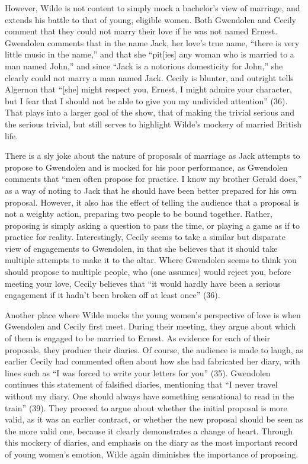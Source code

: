 \documentclass[12pt]{article}[titlepage]
\newcommand{\say}[1]{``#1''}
\newcommand{\1}{\={a}}
\newcommand{\2}{\={e}}
\newcommand{\3}{\={\i}}
\newcommand{\4}{\=o}
\newcommand{\5}{\=u}
\newcommand{\6}{\={A}}
\renewcommand{\,}{\textsuperscript{,}}
\begin{document}
However, Wilde is not content to simply mock a bachelor's view of marriage, and extends his battle to that of young, eligible women.
Both Gwendolen and Cecily comment that they could not marry their love if he was not named Ernest.
Gwendolen comments that in the name Jack, her love's true name, \say{there is very little music in the name,} and that she \say{pit[ies] any woman who is married to a man named John,} and since \say{Jack is a notorious domesticity for John,} she clearly could not marry a man named Jack.
Cecily is blunter, and outright tells Algernon that \say{[she] might respect you, Ernest, I might admire your character, but I fear that I should not be able to give you my undivided attention} (36).
That plays into a larger goal of the show, that of making the trivial serious and the serious trivial, but still serves to highlight Wilde's mockery of married British life.

There is a sly joke about the nature of proposals of marriage as Jack attempts to propose to Gwendolen and is mocked for his poor performance, as Gwendolen comments that \say{men often propose for practice. I know my brother Gerald does,} as a way of noting to Jack that he should have been better prepared for his own proposal.
However, it also has the effect of telling the audience that a proposal is not a weighty action, preparing two people to be bound together.
Rather, proposing is simply asking a question to pass the time, or playing a game as if to practice for reality.
Interestingly, Cecily seems to take a similar but disparate view of engagements to Gwendolen, in that she believes that it should take multiple attempts to make it to the altar.
Where Gwendolen seems to think you should propose to multiple people, who (one assumes) would reject you, before meeting your love, Cecily believes that \say{it would hardly have been a serious engagement if it hadn't been broken off at least once} (36).

Another place where Wilde mocks the young women's perspective of love is when Gwendolen and Cecily first meet.
During their meeting, they argue about which of them is engaged to be married to Ernest.
As evidence for each of their proposals, they produce their diaries.
Of course, the audience is made to laugh, as earlier Cecily had commented often about how she had fabricated her diary, with lines such as \say{I was forced to write your letters for you} (35).
Gwendolen continues this statement of falsified diaries, mentioning that \say{I never travel without my diary. One should always have something sensational to read in the train} (39).
They proceed to argue about whether the initial proposal is more valid, as it was an earlier contract, or whether the new proposal should be seen as the more valid one, because it clearly demonstrates a change of heart.
Through this mockery of diaries, and emphasis on the diary as the most important record of young women's emotion, Wilde again diminishes the importance of proposing.
\end{document}
